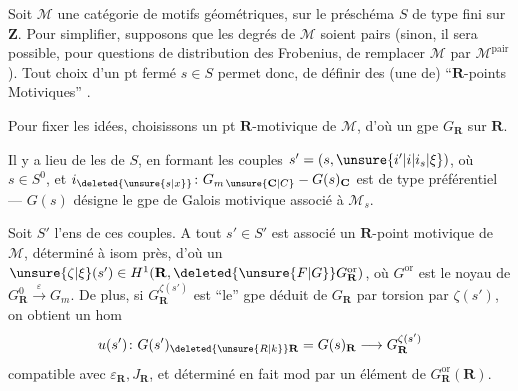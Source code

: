 Soit $\mathcal M$ une catégorie de motifs géométriques,  sur le préschéma $S$ de type fini sur $\mathbf Z$. Pour simplifier, supposons que les degrés de $\mathcal M$ soient pairs (sinon, il sera possible, pour   questions de distribution des Frobenius, de remplacer $\mathcal M$ par $\mathcal M^{\mathrm{pair}}$). Tout choix d'un pt fermé $s\in S$ permet donc, de définir des (une  de) ``$\mathbf R$-points Motiviques''  .

Pour fixer les idées, choisissons un pt $\mathbf R$-motivique de $\mathcal M$, d'où un gpe  $G_{\mathbf R}$ sur $\mathbf R$.

Il y a lieu de   les   de $S$, en formant les couples $s'=(s,\unsure{i'|i|i_s|\xi})$, où $s\in S^0$, et
$i_{\deleted{\unsure{s|x}}}\colon G_{m\,\unsure{\mathbf C|C}}-G(s)_{\mathbf C}$ est de type  préférentiel --- $G(s)$ désigne le gpe de Galois motivique associé à $\mathcal M_s$.

 Soit $S'$ l'ens de ces couples. A tout $s'\in S'$ est associé un $\mathbf R$-point motivique de $\mathcal M$,  déterminé à isom près, d'où un $\unsure{\zeta|\xi}(s')\in H^1(\mathbf R,\deleted{\unsure{F|G}}G_{\mathbf R}^{\mathrm{or}})$, où $G^{\mathrm{or}}$ est le noyau de $G_{\mathbf R}^0\xrightarrow{\varepsilon}G_m$. De plus, si $G_{\mathbf R}^{\zeta(s')}$ est ``le'' gpe déduit de $G_{\mathbf R}$ par torsion par $\zeta(s')$, on obtient un hom
\[
u(s')\colon G(s')_{\deleted{\unsure{R|k}}\mathbf R}=G(s)_{\mathbf R}\longrightarrow G_{\mathbf R}^{\zeta(s')}
\]
compatible avec $\varepsilon_{\mathbf R},J_{\mathbf R}$, et déterminé en fait mod    par un élément de $G_{\mathbf R}^{\mathrm{or}}(\mathbf R)$.
